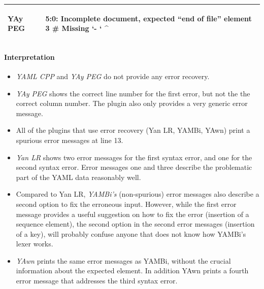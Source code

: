 \begin{table}[H]
\begin{tabular}{lp{}}
    \vspace{0cm}
    YAy PEG &
    \vspace{-0.36cm}
    \begin{textcode}
      5:0: Incomplete document, expected “end of file”
               element 3 # Missing `- `
           ^
    \end{textcode}
    \\

    \bottomrule

  \end{tabular}

\end{table}

\paragraph{Interpretation}

\begin{itemize}

  \item \emph{YAML CPP} and \emph{YAy PEG} do not provide any error recovery.

  \item \emph{YAy PEG} shows the correct line number for the first error, but not the the correct column number. The plugin also only provides a very generic error message.

  \item All of the plugins that use error recovery (Yan LR, YAMBi, YAwn) print a spurious error messages at line 13.

  \item \emph{Yan LR} shows two error messages for the first syntax error, and one for the second syntax error. Error messages one and three describe the problematic part of the YAML data reasonably well.

  \item Compared to Yan LR, \emph{YAMBi’s} (non-spurious) error messages also describe a second option to fix the erroneous input. However, while the first error message provides a useful suggestion on how to fix the error (insertion of a sequence element), the second option in the second error messages (insertion of a key), will probably confuse anyone that does not know how YAMBi’s lexer works.

  \item \emph{YAwn} prints the same error messages as YAMBi, without the crucial information about the expected element. In addition YAwn prints a fourth error message that addresses the third syntax error.

\end{itemize}

